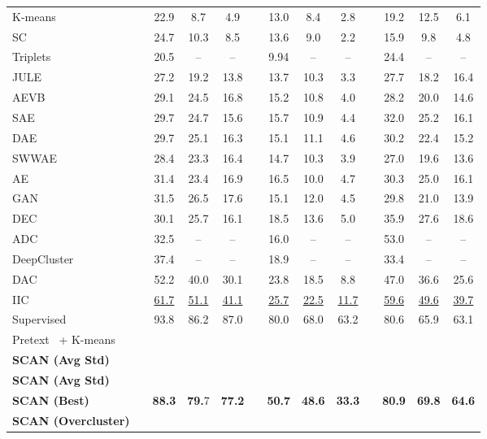 \documentclass[runningheads]{llncs}
\begin{document}
\begin{table}[t]
\begin{center}
{\begin{tabular}{@{}l c ccc c ccc c ccc@{}}
K-means~\cite{wang2015optimized}     && 22.9 & 8.7   & 4.9  && 13.0  & 8.4  & 2.8 && 19.2 & 12.5 & 6.1  \\
SC~\cite{zelnik2005self}             && 24.7 & 10.3  & 8.5  && 13.6  & 9.0  & 2.2 && 15.9 & 9.8  & 4.8  \\
Triplets~\cite{schultz2004learning}  && 20.5 & --    & --   && 9.94  & --   & --  && 24.4 & --   & --   \\
JULE~\cite{yang2016joint}            && 27.2 & 19.2  & 13.8 && 13.7  & 10.3 & 3.3 && 27.7 & 18.2 & 16.4 \\
AEVB~\cite{kingma2013auto}           && 29.1 & 24.5  & 16.8 && 15.2  & 10.8 & 4.0 && 28.2 & 20.0 & 14.6 \\
SAE~\cite{ng2011sparse}              && 29.7 & 24.7  & 15.6 && 15.7  & 10.9 & 4.4 && 32.0 & 25.2 & 16.1 \\
DAE~\cite{vincent2010stacked}        && 29.7 & 25.1  & 16.3 && 15.1  & 11.1 & 4.6 && 30.2 & 22.4 & 15.2 \\
SWWAE~\cite{zhao2015stacked}         && 28.4 & 23.3  & 16.4 && 14.7  & 10.3 & 3.9 && 27.0 & 19.6 & 13.6 \\
AE~\cite{bengio2007greedy}           && 31.4 & 23.4  & 16.9 && 16.5  & 10.0 & 4.7 && 30.3 & 25.0 & 16.1 \\
GAN~\cite{radford2015unsupervised}   && 31.5 & 26.5  & 17.6 && 15.1  & 12.0 & 4.5 && 29.8 & 21.0 & 13.9 \\
DEC~\cite{DEC}                       && 30.1 & 25.7  & 16.1 && 18.5  & 13.6 & 5.0 && 35.9 & 27.6 & 18.6 \\
ADC~\cite{haeusser2018associative}   && 32.5 & --    & --   && 16.0  & --   & --  && 53.0 & --   & --   \\
DeepCluster~\cite{DeepCluster}       && 37.4 & --    & --   && 18.9  & --   & --  && 33.4 & --   & --   \\
DAC~\cite{DAC}                       && 52.2 & 40.0 & 30.1 && 23.8& 18.5 & 8.8 && 47.0 & 36.6 & 25.6 \\
IIC~\cite{IIC} && \underline{61.7} & \underline{51.1}  & \underline{41.1} && \underline{25.7}  & \underline{22.5} & \underline{11.7}&& \underline{59.6} & \underline{49.6} & \underline{39.7} \\
\midrule
Supervised  && 93.8 &  86.2 & 87.0   && 80.0 & 68.0 & 63.2 && 80.6 & 65.9 & 63.1\\
Pretext~\cite{chen2020simple} + K-means &&  &  &    &&  &  &  &&  &  & \\
\textbf{SCAN (Avg  Std) }  && &  & &&  &  &  &&  & &  \\
\textbf{SCAN (Avg  Std) } && &  & &&  &  &  &&  & &  \\
\textbf{SCAN (Best)} && \textbf{88.3} &\textbf{79.}7 & \textbf{77.2} && \textbf{50.7} & \textbf{48.6} & \textbf{33.3} && \textbf{80.9} & \textbf{69.8} & \textbf{64.6} \\
\midrule
\textbf{SCAN (Overcluster)} && &  & &&  &  &  &&  & &  \\
\bottomrule
\end{tabular}
}
\end{center}
\end{table}
\setlength{\tabcolsep}{1.4pt}
\end{document}
